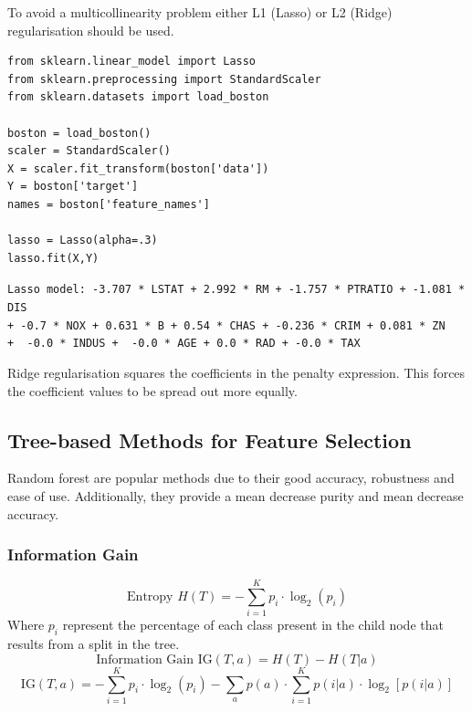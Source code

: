 \documentclass[11pt]{article}
\theoremstyle{definition}
\begin{document}
To avoid a multicollinearity problem either L1 (Lasso) or L2 (Ridge) regularisation should be used.

\begin{verbatim}
from sklearn.linear_model import Lasso
from sklearn.preprocessing import StandardScaler
from sklearn.datasets import load_boston

boston = load_boston()
scaler = StandardScaler()
X = scaler.fit_transform(boston['data'])
Y = boston['target']
names = boston['feature_names']

lasso = Lasso(alpha=.3)
lasso.fit(X,Y)
\end{verbatim}
\texttt{Lasso model: -3.707 * LSTAT + 2.992 * RM + -1.757 * PTRATIO + -1.081 * DIS\\
	+ -0.7 * NOX + 0.631 * B + 0.54 * CHAS + -0.236 * CRIM + 0.081 * ZN\\
	+ {\color{red} -0.0 * INDUS} + {\color{red} -0.0 * AGE} + {\color{red}0.0 * RAD} + {\color{red}-0.0 * TAX}}

\vspace{0.5em}
\noindent
Ridge regularisation squares the coefficients in the penalty expression. This forces the coefficient values to be spread out more equally.

\subsection{Tree-based Methods for Feature Selection}
Random forest are popular methods due to their good accuracy, robustness and ease of use. Additionally, they provide a mean decrease purity and mean decrease accuracy.

\subsubsection{Information Gain}
\begin{equation*}
	\text{Entropy }H(T) = -\sum_{i=1}^{K} p_i\cdot\log_2(p_i)
\end{equation*}
Where $p_i$ represent the percentage of each class present in the child node that results from a split in the tree.
\begin{equation*}
	\text{Information Gain } \text{IG}(T,a) = H(T) - H(T|a)
\end{equation*}
\begin{equation*}
	\text{IG}(T,a) = -\sum_{i=1}^{K} p_i\cdot\log_2(p_i) - \sum_a p(a)\cdot\sum_{i=1}^{K} p(i|a)\cdot\log_2[p(i|a)]
\end{equation*}
\end{document}
